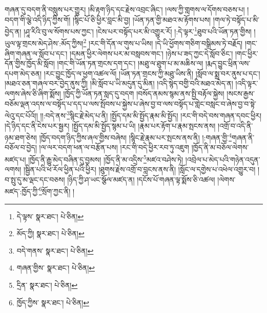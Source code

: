 གཞན་དུ་བདག་ནི་བསླུས་པར་གྱུར། །མི་རྟག་ཉིད་དང་རྗེས་འབྲང་ཞིང་། །ལས་ཀྱི་གླགས་ལ་དོགས་བཅས་པ། །བདག་གི་ལྕེ་འདི་ཉིད་ཀྱིས་གོ། །སྙིང་པོ་ཅི་ཕྱིར་བླང་མི་བྱ། །ཡོན་ཏན་གྱི་མཐའ་མ་རྟོགས་པས། །གལ་ཏེ་བསྟོད་པ་མི་བྱེད་ན། །ཤཱ་རིའི་བུ་ལ་སོགས་པས་ཀྱང་། །ངེས་པར་བསྟོད་པར་མི་འགྱུར་རོ། །:དེ་ལྟར་\footnote{དེ་ལྟས་  སྣར་ཐང་།  པེ་ཅིན། }ཐུབ་པའི་ཡོན་ཏན་གྱིས། །ཡུལ་ལྟ་གྲངས་མེད་ཤེས་:མོད་ཀྱིས།\footnote{མོད་ཀྱི།  སྣར་ཐང་།  པེ་ཅིན། } །རང་གི་དོན་ལ་གུས་པ་ཡིས། །དེ་ཡི་ཕྱོགས་གཅིག་བསྒྲིམས་ཏེ་བརྗོད། །གང་ཞིག་གཞན་ལ་སློབ་པ་དང་། །དམན་ཕྱིར་ལེགས་པར་མ་བསླབས་གང་། །ཉེས་པ་ཟད་ཀྱང་དེ་སློབ་ཅིང་། །གང་ཕྱིར་དོན་གྱིས་ཁྱོད་མི་སློབ། །གང་གི་ཡོན་ཏན་གྲངས་དག་དང་། །མཐུ་ལ་ཐུག་པ་མ་མཆིས་ལ། །རྨད་བྱུང་ཕྲིན་ལས་དཔག་མེད་ཅན། །རང་བྱུང་ཁྱོད་ལ་ཕྱག་འཚལ་ལོ། །ཡོན་ཏན་གྲངས་ཀྱི་མཐུ་ཡིས་ནི། །སློབ་ལ་སྨྲ་བར་ནུས་པ་དང་། །མཐའ་ཅན་གཞལ་བར་བྱེད་ནུས་ཀྱི། །མི་སློབ་པ་ཡི་མདུན་དུ་མིན། །འདི་སྙེད་བགྱི་བའི་མཐའ་མེད་ན། །འདི་ལྟར་ལགས་ཞེས་ཅི་ཞིག་སྨོས། །ཁྱོད་ཀྱི་ཡོན་ཏན་སླད་དུ་བདག །བསོད་ནམས་སྙམ་ནས་སྤྱི་བརྟོལ་སྐྱེས། །སངས་རྒྱས་བཅོམ་ལྡན་འདས་ལ་བསྟོད་པ་དད་པ་ལས་སྤོབས་པ་སྐྱེས་པ་ཞེས་བྱ་བ་ལས་བསྟོད་པ་གླེང་བསླང་བ་ཞེས་བྱ་བ་སྟེ་ལེའུ་དང་པོའོ།། །།:བདེ་ནས་\footnote{བདེ་གནས་  སྣར་ཐང་།  པེ་ཅིན། }སྙིང་རྗེ་མེད་པ་ནི། །སྤྱོད་དམ་མི་སྤྱོད་རྣམ་མི་སྤྱོད། །རང་གི་བདེ་བས་གཞན་དབང་ཕྱིར། །དེ་ཉིད་དང་ནི་ངེས་པར་སྦྱར། །སྤྱོད་དམ་མི་སྤྱོད་སྙམ་པ་ཡི། །རྣམ་པར་རྟོག་པ་རྣམ་སྤངས་ནས། །འགྲོ་བ་འདི་ནི་ཉམ་ཐག་ཅེས། །ཁྱོད་བདག་ཉིད་ཀྱིས་ཞལ་གྱིས་བཞེས། །སྙིང་རྗེ་རྣམ་པར་སྤངས་ནས་ནི། །:གཞན་གྱི་\footnote{གཞན་གྱིས་  སྣར་ཐང་།  པེ་ཅིན། }གཞན་ནི་བཅོལ་བ་བྱེད། །ལ་ལར་བདག་ཕན་ལ་བརྩོན་པས། །རང་གི་བདེ་ཕྱིར་རབ་ཏུ་འཇུག །ཁྱོད་ནི་མ་བཅོལ་ལེགས་མཛད་པ། །ཁྱོད་ནི་རྒྱུ་མེད་བཞིན་དུ་བྱམས། །ཁྱོད་ནི་མ་འདྲིས་\footnote{དྲིན་  སྣར་ཐང་།  པེ་ཅིན། }མཛའ་བཤེས་ཏེ། །འབྲེལ་པ་མེད་པའི་གཉེན་འདུན་ལགས། །སྦྱིན་པའི་ཕ་རོལ་ཕྱིན་པའི་ཕྱིར། །ཐུགས་རྗེས་འགྲོ་བ་བླངས་ནས་ནི། །སློང་ལ་དགྱེས་པ་འཕེལ་འགྱུར་བ། །བ་སྤུ་དུ་མ་ལྡང་དང་བཅས། །ཉིད་ཀྱི་ཤ་ཡང་སྩོལ་མཛད་ན། །དངོས་པོ་གཞན་ལྟ་སྨོས་ཅི་འཚལ། །ལེགས་མཛད་:ཁྱོད་ཀྱི་\footnote{ཁྱོད་ཀྱིས་  སྣར་ཐང་།  པེ་ཅིན། }སྲོག་ཀྱང་ནི། །
